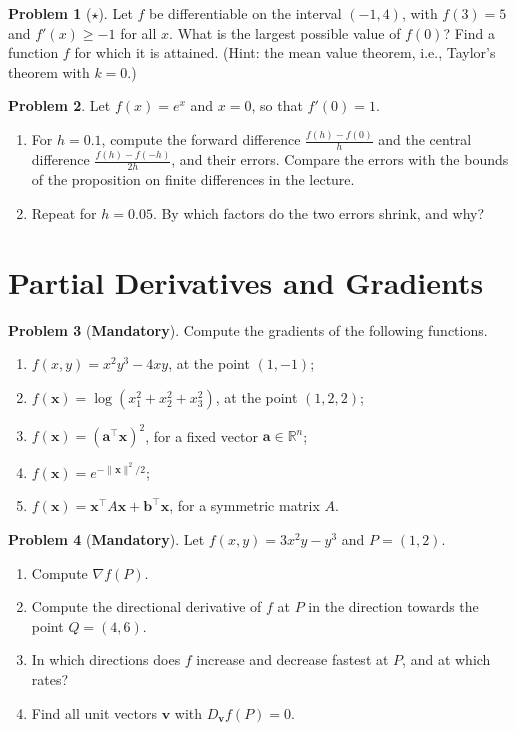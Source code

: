 \documentclass[11pt]{article}
\theoremstyle{definition}
\newtheorem{problem}{Problem}[section]
\newcommand{\mandatory}{\textcolor{red!70!black}{\textbf{Mandatory}}}
\newcommand{\norm}[1]{\lVert #1 \rVert}
\begin{document}
\begin{problem}[$\star$]\label{pr:mvt}
    Let $f$ be differentiable on the interval $(-1, 4)$, with $f(3) = 5$ and $f'(x) \geq -1$ for all $x$. What is the largest possible value of $f(0)$? Find a function $f$ for which it is attained. (Hint: the mean value theorem, i.e., Taylor's theorem with $k = 0$.)
\end{problem}

\begin{problem}\label{pr:finite-diff}
    Let $f(x) = e^x$ and $x = 0$, so that $f'(0) = 1$.
    \begin{enumerate}[label=(\alph*)]
        \item For $h = 0.1$, compute the forward difference $\frac{f(h) - f(0)}{h}$ and the central difference $\frac{f(h) - f(-h)}{2h}$, and their errors. Compare the errors with the bounds of the proposition on finite differences in the lecture.
        \item Repeat for $h = 0.05$. By which factors do the two errors shrink, and why?
    \end{enumerate}
\end{problem}

\section{Partial Derivatives and Gradients}

\begin{problem}[\mandatory]\label{pr:gradients-compute}
    Compute the gradients of the following functions.
    \begin{enumerate}[label=(\alph*)]
        \item $f(x, y) = x^2 y^3 - 4xy$, at the point $(1, -1)$;
        \item $f(\mathbf{x}) = \log(x_1^2 + x_2^2 + x_3^2)$, at the point $(1, 2, 2)$;
        \item $f(\mathbf{x}) = (\mathbf{a}^\top\mathbf{x})^2$, for a fixed vector $\mathbf{a} \in \mathbb{R}^n$;
        \item $f(\mathbf{x}) = e^{-\norm{\mathbf{x}}^2/2}$;
        \item $f(\mathbf{x}) = \mathbf{x}^\top A\mathbf{x} + \mathbf{b}^\top\mathbf{x}$, for a symmetric matrix $A$.
    \end{enumerate}
\end{problem}

\begin{problem}[\mandatory]\label{pr:directional}
    Let $f(x, y) = 3x^2 y - y^3$ and $P = (1, 2)$.
    \begin{enumerate}[label=(\alph*)]
        \item Compute $\nabla f(P)$.
        \item Compute the directional derivative of $f$ at $P$ in the direction towards the point $Q = (4, 6)$.
        \item In which directions does $f$ increase and decrease fastest at $P$, and at which rates?
        \item Find all unit vectors $\mathbf{v}$ with $D_{\mathbf{v}} f(P) = 0$.
    \end{enumerate}
\end{problem}
\end{document}
